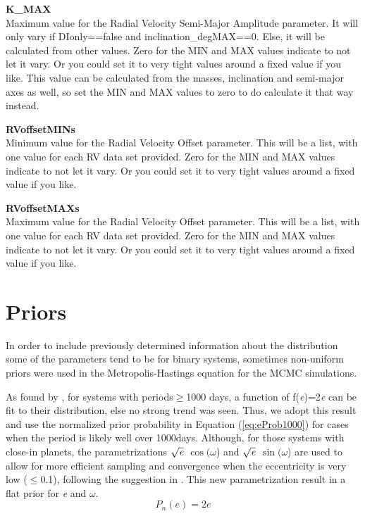 \documentclass[12pt,preprint]{aastex}
\begin{document}
{\bf K\_MAX}\\
Maximum value for the Radial Velocity Semi-Major Amplitude parameter.  It will only vary if DIonly==false and inclination\_degMAX==0.  Else, it will be calculated from other values.
Zero for the MIN and MAX values indicate to not let it vary.  Or you could set it to very tight values around a fixed value if you like.  This value can be calculated from the masses, inclination and semi-major axes as well, so set the MIN and MAX values to zero to do calculate it that way instead.

{\bf RVoffsetMINs}\\
Minimum value for the Radial Velocity Offset parameter.  This will be a list, with one value for each RV data set provided.
Zero for the MIN and MAX values indicate to not let it vary.  Or you could set it to very tight values around a fixed value if you like.

{\bf RVoffsetMAXs}\\
Maximum value for the Radial Velocity Offset parameter.  This will be a list, with one value for each RV data set provided.
Zero for the MIN and MAX values indicate to not let it vary.  Or you could set it to very tight values around a fixed value if you like.



\section{Priors}\label{sec:priors}

In order to include previously determined information about the distribution some of the parameters tend to be for binary systems, sometimes non-uniform priors were used in the Metropolis-Hastings equation for the MCMC simulations.

As found by \citet{duquennoy1991}, for systems with periods$\geq$1000 days, a function of f({\it e})=2{\it e} can be fit to their distribution, else no strong trend was seen.  Thus, we adopt this result and use the normalized prior probability in Equation (\ref{eq:eProb1000}) for cases when the period is likely well over 1000days.  Although, for those systems with close-in planets, the parametrizations $\sqrt{{\it e}}$ $\cos(\omega$) and $\sqrt{{\it e}}$ $\sin(\omega$) are used to allow for more efficient sampling and convergence when the eccentricity is very low ($\le$0.1), following the suggestion in \citet{albrecht2012}. This new parametrization result in a flat prior for {\it e} and $\omega$.
\begin{equation}\label{eq:eProb1000}
P_n(e) =  2e
\end{equation}
\end{document}
